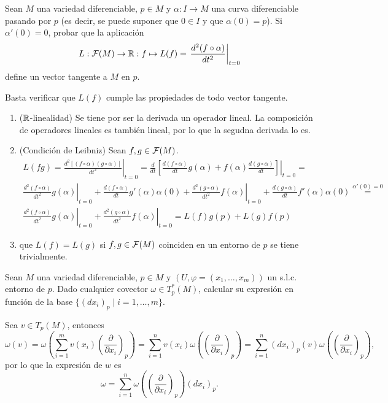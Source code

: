\documentclass[twoside]{article}
\begin{document}
\begin{ejercicio}{3}
Sean $M$ una variedad diferenciable, $p \in M$ y $\alpha : I \to M$ una curva diferenciable
pasando por $p$ (es decir, se puede suponer que $0 \in I$ y que $\alpha(0) = p$).
Si $\alpha'(0) = 0$, probar que la aplicación
$$L:\mathcal{F}(M)\to\mathbb{R}:f\mapsto L(f)=\left.\frac{d^2(f\circ\alpha)}{dt^2}\right|_{t=0}$$
define un vector tangente a $M$ en $p$.
\end{ejercicio}
\begin{solucion}
Basta verificar que $L(f)$ cumple las propiedades de todo vector tangente. 
\begin{enumerate}
\item ($\mathbb{R}$-linealidad) Se tiene por ser la derivada un operador lineal. La composición de operadores lineales es también lineal, por lo que la segudna derivada lo es.
\item (Condición de Leibniz) Sean $f,g\in\mathcal{F}(M)$. 
\begin{gather*}
L(fg)=\left.\frac{d^2[(f\circ\alpha)(g\circ\alpha)]}{dt^2}\right|_{t=0}=\left.\frac{d}{dt}\left[\frac{d(f\circ\alpha)}{dt}g(\alpha)+f(\alpha)\frac{d(g\circ\alpha)}{dt}\right]\right|_{t=0}=\\
\left.\frac{d^2(f\circ\alpha)}{dt^2}g(\alpha)\right|_{t=0}+\frac{d(f\circ\alpha)}{dt}g'(\alpha)\alpha(0)+\left.\frac{d^2(g\circ\alpha)}{dt^2}f(\alpha)\right|_{t=0}+\frac{d(g\circ\alpha)}{dt}f'(\alpha)\alpha(0)\overset{\alpha'(0)=0}{=}\\
\left.\frac{d^2(f\circ\alpha)}{dt^2}g(\alpha)\right|_{t=0}+\left.\frac{d^2(g\circ\alpha)}{dt^2}f(\alpha)\right|_{t=0}=L(f)g(p)+L(g)f(p)
\end{gather*}
\item que $L(f)=L(g)$ si $f,g\in\mathcal{F}(M)$ coinciden en un entorno de $p$ se tiene trivialmente.
\end{enumerate}
\end{solucion}

\newpage

\begin{ejercicio}{4}
Sean $M$ una variedad diferenciable, $p \in M$ y $(U, \varphi = (x_1, \dots , x_m))$ un s.l.c.
entorno de $p$. Dado cualquier covector $\omega \in T^*_p (M)$, calcular su expresión en
función de la base $\{(dx_i)_p \mid i = 1, \dots ,m\}$.
\end{ejercicio}
\begin{solucion}
Sea $v\in T_p(M)$, entonces
\[
\omega(v)=\omega\left(\sum_{i=1}^m v(x_i)\left(\frac{\partial}{\partial x_i}\right)_p\right)=\sum_{i=1}^nv(x_i)\omega\left(\left(\frac{\partial}{\partial x_i}\right)_p\right)=\sum_{i=1}^n(dx_i)_p(v)\omega\left(\left(\frac{\partial}{\partial x_i}\right)_p\right),
\]
por lo que la expresión de $w$ es
$$\omega=\sum_{i=1}^n\omega\left(\left(\frac{\partial}{\partial x_i}\right)_p\right)(dx_i)_p.$$
\end{solucion}
\end{document}
